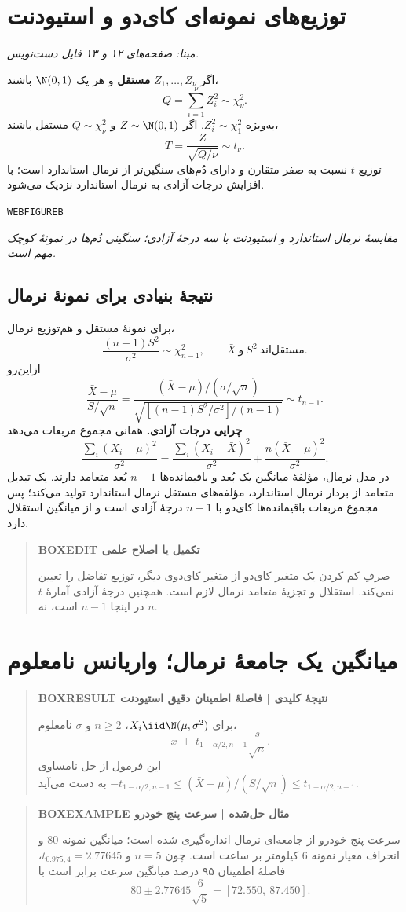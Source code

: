 \section{توزیع‌های نمونه‌ای کای‌دو و استیودنت}
\textit{مبنا: صفحه‌های ۱۲ و ۱۳ فایل دست‌نویس.}\par 
اگر $Z_1,\ldots,Z_\nu$ \textbf{مستقل} و هر یک $\N(0,1)$ باشند،
\[Q=\sum_{i=1}^{\nu}Z_i^2\sim\chi^2_\nu.\]
به‌ویژه $Z_i^2\sim\chi^2_1$. اگر $Z\sim\N(0,1)$ و $Q\sim\chi^2_\nu$ مستقل باشند،
\[T=\frac{Z}{\sqrt{Q/\nu}}\sim t_\nu.\]
توزیع $t$ نسبت به صفر متقارن و دارای دُم‌های سنگین‌تر از نرمال استاندارد است؛ با افزایش درجات آزادی به نرمال استاندارد نزدیک می‌شود.



\texttt{WEBFIGUREB}


\textit{مقایسهٔ نرمال استاندارد و استیودنت با سه درجهٔ آزادی؛ سنگینی دُم‌ها در نمونهٔ کوچک مهم است.}\par 

\subsection{نتیجهٔ بنیادی برای نمونهٔ نرمال}
برای نمونهٔ مستقل و هم‌توزیع نرمال،
\[
\frac{(n-1)S^2}{\sigma^2}\sim\chi^2_{n-1},
\qquad \bar X\ \text{و}\ S^2\ \text{مستقل‌اند}.
\]
ازاین‌رو
\[
\frac{\bar X-\mu}{S/\sqrt n}
=\frac{(\bar X-\mu)/(\sigma/\sqrt n)}
{\sqrt{[(n-1)S^2/\sigma^2]/(n-1)}}
\sim t_{n-1}.
\]
\textbf{چرایی درجات آزادی.} همانی مجموع مربعات می‌دهد
\[
\frac{\sum_i(X_i-\mu)^2}{\sigma^2}
=\frac{\sum_i(X_i-\bar X)^2}{\sigma^2}
+\frac{n(\bar X-\mu)^2}{\sigma^2}.
\]
در مدل نرمال، مؤلفهٔ میانگین یک بُعد و باقیمانده‌ها $n-1$ بُعد متعامد دارند. یک تبدیل متعامد از بردار نرمال استاندارد، مؤلفه‌های مستقل نرمال استاندارد تولید می‌کند؛ پس مجموع مربعات باقیمانده‌ها کای‌دو با $n-1$ درجهٔ آزادی است و از میانگین استقلال دارد.
\begin{quote}\textbf{BOXEDIT تکمیل یا اصلاح علمی}\par صرفِ کم کردن یک متغیر کای‌دو از متغیر کای‌دوی دیگر، توزیع تفاضل را تعیین نمی‌کند. استقلال و تجزیهٔ متعامد نرمال لازم است. همچنین درجهٔ آزادی آمارهٔ $t$ در اینجا $n-1$ است، نه $n$.\end{quote}
\section{میانگین یک جامعهٔ نرمال؛ واریانس نامعلوم}
\begin{quote}\textbf{BOXRESULT نتیجهٔ کلیدی | فاصلهٔ اطمینان دقیق استیودنت}\par 
برای $X_i\iid\N(\mu,\sigma^2)$، $n\ge2$ و $\sigma$ نامعلوم،
\[
\boxed{\bar x\ \pm\ t_{1-\alpha/2,n-1}\frac{s}{\sqrt n}.}
\]
این فرمول از حل نامساوی $-t_{1-\alpha/2,n-1}\le(\bar X-\mu)/(S/\sqrt n)\le t_{1-\alpha/2,n-1}$ به دست می‌آید.
\end{quote}
\begin{quote}\textbf{BOXEXAMPLE مثال حل‌شده | سرعت پنج خودرو}\par 
سرعت پنج خودرو از جامعه‌ای نرمال اندازه‌گیری شده است؛ میانگین نمونه $80$ و انحراف معیار نمونه $6$ کیلومتر بر ساعت است. چون $n=5$ و $t_{0.975,4}=2.77645$، فاصلهٔ اطمینان ۹۵ درصد میانگین سرعت برابر است با
\[
80\pm2.77645\frac6{\sqrt5}
=\boxed{[72.550,\ 87.450]}.
\]
\end{quote}
